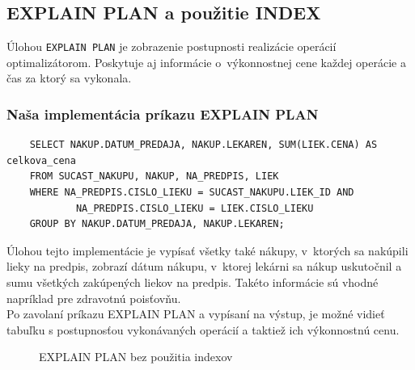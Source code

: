 \documentclass[a4paper, 11pt]{article}
\begin{document}
	\subsection{EXPLAIN PLAN a použitie INDEX}
        		Úlohou \texttt{EXPLAIN PLAN} je zobrazenie postupnosti realizácie operácií optimalizátorom. Poskytuje aj informácie o~výkonnostnej cene každej operácie a čas za ktorý sa vykonala. 
        
        \subsubsection{Naša implementácia príkazu EXPLAIN PLAN}
    \begin{lstlisting}
    SELECT NAKUP.DATUM_PREDAJA, NAKUP.LEKAREN, SUM(LIEK.CENA) AS celkova_cena
    FROM SUCAST_NAKUPU, NAKUP, NA_PREDPIS, LIEK
    WHERE NA_PREDPIS.CISLO_LIEKU = SUCAST_NAKUPU.LIEK_ID AND 
    		NA_PREDPIS.CISLO_LIEKU = LIEK.CISLO_LIEKU
    GROUP BY NAKUP.DATUM_PREDAJA, NAKUP.LEKAREN;
    \end{lstlisting}
        Úlohou tejto implementácie je vypísať všetky také nákupy, v~ktorých sa nakúpili lieky na predpis, zobrazí dátum nákupu, v~ktorej lekárni sa nákup uskutočnil a sumu všetkých zakúpených liekov na predpis. Takéto informácie sú vhodné napríklad pre zdravotnú poisťovňu.\\

	Po zavolaní príkazu EXPLAIN PLAN a vypísaní na výstup, je možné vidieť tabuľku s postupnosťou vykonávaných operácií a taktiež ich výkonnostnú cenu.
	\begin{figure}[h]
	\centering
	\caption{EXPLAIN PLAN bez použitia indexov}
	\end{figure}
\end{document}
